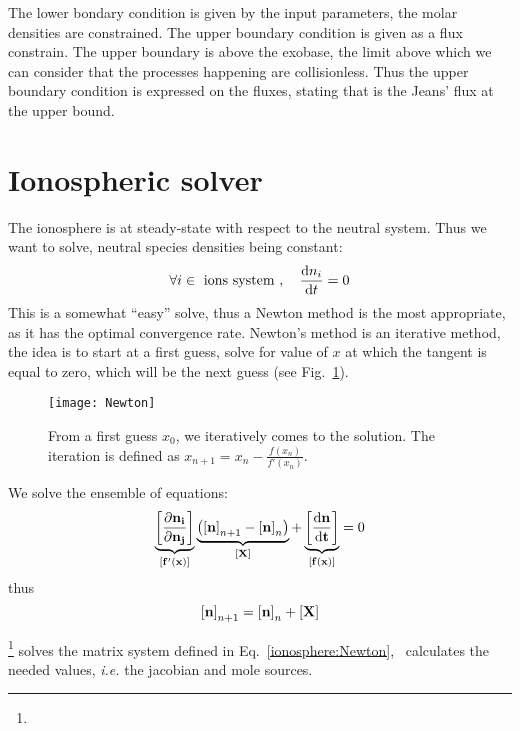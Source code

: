 The lower bondary condition is given by the input parameters, the molar densities
are constrained. The upper boundary condition is given as a flux constrain. The
upper boundary is above the exobase, the limit above which we can consider that
the processes happening are collisionless. Thus the upper boundary condition
is expressed on the fluxes, stating that \doverdz{\conc} is the Jeans' flux
at the upper bound.

\section{Ionospheric solver}

The ionosphere is at steady-state with respect to the
neutral system. Thus we want to solve, neutral species
densities being constant:
\begin{equation}
\forall i \in \text{ ions system },\quad \frac{\mathrm{d} n_i}{\mathrm{d} t} = 0
\label{ionosphere:steady_state}
\end{equation}
%
This is a somewhat ``easy'' solve, thus a Newton method is the
most appropriate, as it has the optimal convergence rate.
Newton's method is an iterative method, the idea is to start
at a first guess, solve for value of $x$ at which the tangent is
equal to zero, which will be the next guess (see Fig.~\ref{Newton:solve}).
\begin{figure}
\centering
\texttt{[image: Newton]}
\caption{\label{Newton:solve}From a first guess $x_0$, we iteratively
comes to the solution. The iteration is defined as $x_{n+1} = x_n - \frac{f(x_n)}{f'(x_n)}$.}
\end{figure}
We solve the ensemble of equations:
\begin{equation}
\underbrace{\left[\mathbf{\frac{\partial n_i}{\partial n_j}}\right]}_{\left[\mathbf{f'(x)}\right]} 
                \underbrace{\left(\left[\mathbf{n}\right]_{n+1} - \left[\mathbf{n}\right]_n\right)}_{\left[\mathbf{X}\right]} + 
                \underbrace{\left[\mathbf{\frac{\mathrm{d} n}{\mathrm{d} t}}\right]}_{\left[\mathbf{f(x)}\right]} = 0
\label{ionosphere:Newton}
\end{equation}
thus
\begin{equation}
\left[\mathbf{n}\right]_{n+1} = \left[\mathbf{n}\right]_n + \left[\mathbf{X}\right]
\label{ionosphere:Newton:iter}
\end{equation}

\Eigen\footnote{\EigenTux} solves the matrix system defined in Eq.~\ref{ionosphere:Newton}, \PINC\ calculates
the needed values, \textit{i.e.} the jacobian and mole sources.
